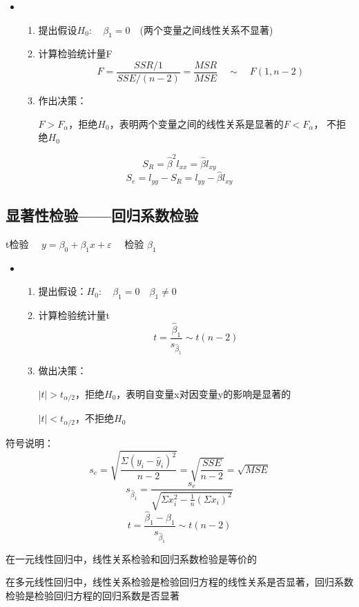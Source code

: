 \documentclass[UTF8,10pt]{book}
\begin{document}
{\begin{itemize}
	\item [] {
		\begin{enumerate}
			\item 提出假设$H_0 :\quad \beta_1 = 0 \quad$(两个变量之间线性关系不显著)
			\item 计算检验统计量F $$\quad F = \frac{SSR/1}{SSE/(n-2)} =\frac{MSR}{MSE} \quad \sim \quad F(1,n-2) $$		
			\item 作出决策：
			
			$F>F_{\alpha}$，拒绝$H_0$，表明两个变量之间的线性关系是显著的$F<F_{\alpha}$，
			不拒绝$H_0$ 
			
		\end{enumerate}
	}
\end{itemize}

$$ S_R = \hat{\beta}^2 l_{xx}=\hat{\beta}l_{xy} $$ 
$$ S_e = l_{yy} - S_R = l_{yy}-\hat{\beta}l_{xy} $$

\subsection{显著性检验——回归系数检验}	
t检验 
$\quad y = \beta_0 + \beta_1 x+ \varepsilon \quad$
检验 $\beta_1$

\begin{itemize}
	\item [] {
		\begin{enumerate}
			\item 提出假设：$H_0: \quad \beta_1 = 0 \quad \beta_1 \neq 0$
			\item 计算检验统计量t $$t = \frac{\hat{\beta}_1}{s_{\hat{\beta}_1}} \sim t(n-2) $$		
			\item 做出决策：
			
			$|t|>t_{\alpha/2}$，拒绝$H_0$，表明自变量x对因变量y的影响是显著的
			
			$|t|<t_{\alpha/2}$，不拒绝$H_0$ 
			
		\end{enumerate}
	}
\end{itemize}

符号说明： 
$$ s_e = \sqrt{\frac{\Sigma (y_i - \hat{y}_i)^2}{n-2}} = \sqrt{\frac{SSE}{n-2}}=\sqrt{MSE} $$ 
$$s_{\hat{\beta}_1} = \frac{s_e}{\sqrt{\Sigma x_i^2 - \frac{1}{n}(\Sigma x_i)^2}} $$ 
$$t = \frac{\hat{\beta}_1 - \beta_1}{s_{\hat{\beta}_1}} \sim t(n-2)$$

{\kaishu 
在一元线性回归中，线性关系检验和回归系数检验是等价的

在多元线性回归中，线性关系检验是检验回归方程的线性关系是否显著，回归系数检验是检验回归方程的回归系数是否显著

}}
\end{document}
